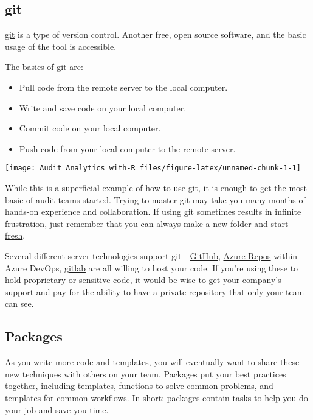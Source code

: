 \documentclass[
]{book}
\providecommand{\tightlist}{%
  \setlength{\itemsep}{0pt}\setlength{\parskip}{0pt}}
\begin{document}
\hypertarget{git}{%
\subsection{git}\label{git}}

\href{https://git-scm.com}{git} is a type of version control. Another free, open source software, and the basic usage of the tool is accessible.

The basics of git are:

\begin{itemize}
\tightlist
\item
  Pull code from the remote server to the local computer.
\item
  Write and save code on your local computer.
\item
  Commit code on your local computer.
\item
  Push code from your local computer to the remote server.
\end{itemize}

\texttt{[image: Audit\_Analytics\_with-R\_files/figure-latex/unnamed-chunk-1-1]}

While this is a superficial example of how to use git, it is enough to get the most basic of audit teams started. Trying to master git may take you many months of hands-on experience and collaboration. If using git sometimes results in infinite frustration, just remember that you can always \href{https://xkcd.com/1597/}{make a new folder and start fresh}.

Several different server technologies support git - \href{https://github.com}{GitHub}, \href{https://azure.microsoft.com/en-us/services/devops/repos/}{Azure Repos} within Azure DevOps, \href{https://gitlab.com}{gitlab} are all willing to host your code. If you're using these to hold proprietary or sensitive code, it would be wise to get your company's support and pay for the ability to have a private repository that only your team can see.

\hypertarget{packages}{%
\subsection{Packages}\label{packages}}

As you write more code and templates, you will eventually want to share these new techniques with others on your team. Packages put your best practices together, including templates, functions to solve common problems, and templates for common workflows. In short: packages contain tasks to help you do your job and save you time.
\end{document}

